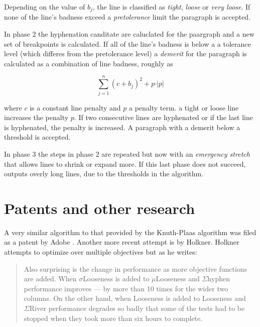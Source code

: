 {{{\begin{description}
Depending on the value of $b_j$, the line is classified as \textit{tight}, \textit{loose} or  \textit{very loose}. If none of the line's badness exceed a \textit{pretolerance}  limit the paragraph is accepted. 

\item[Phase 2] In phase 2 the hyphenation canditate are caluclated for the paargraph and a new set of breakpoints is calculated. If all of the line's badness is below a a tolerance level  (which differes from the pretolerance level) a \textit{demerit} for the paragraph is calculated as a combination of line badness, roughly as

\begin{equation}
\sum_{j=1}^{n}  \left(c+b_j \right)^{2} + p \cdot \vert p\vert 
\end{equation}

where $c$ is a constant line penalty and $p$ a penalty term. a tight or loose line increases the penalty $p$. If two consecutive lines are hyphenated or if the last line is hyphenated, the penalty is increased. A paragraph with a demerit
below a threshold is accepted.

\item[Phase 3] In phase 3 the steps in phase 2 are repeated but now with an \textit{emergency stretch} that allows lines to shrink or expand more. If this last phase does not succeed, \tex outputs overly long lines, due to the thresholds in the algorithm.


\end{description}


\section{Patents and other research}

A very similar algorithm to that provided by the Knuth-Plaas algorithm was filed as a patent
by Adobe \cite{adobepatent}. Another more recent attempt is by Holkner\cite{Holkner2006}. Holkner attempts to optimize over multiple objectives but as he writes:

\begin{quote}
Also surprising is the change in performance as more objective functions are added. When
$\sigma$Looseness is added to $\mu$Looseness and $\Sigma\text{hyphen}$ performance improves --- by more than 10 times
for the wider two columns. On the other hand, when Looseness is added to Looseness and $\Sigma\text{River}$
performance degrades so badly that some of the tests had to be stopped when they took more than six
hours to complete.


\end{quote}}}}
